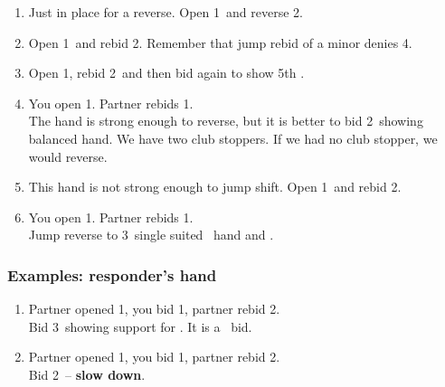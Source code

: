 \documentclass[12pt, a4paper]{article}
\begin{document}
\begin{enumerate}
    \item
        Just in place for a reverse. Open 1\clubs\ and reverse 2\hearts.
    \item
        Open 1\diams\ and rebid 2\hearts. Remember that jump rebid of a minor 
        denies 4\major.
    \item 
        Open 1\clubs, rebid 2\hearts\ and then bid again to show 5th \hearts.
    \item 
        You open 1\diams. Partner rebids 1\spades. \\
        The hand is strong enough to reverse, but
        it is better to bid 2\nt\ showing balanced hand. We have two club stoppers. If we had no
        club stopper, we would reverse.
    \item 
        This hand is not strong enough to jump shift. Open 1\diams\ and rebid 2\clubs.
    \item
        You open 1\clubs. Partner rebids 1\spades. \\
        Jump reverse to 3\diams\ single suited \clubs\ hand and \gf.
        
\end{enumerate}

\subsubsection*{Examples: responder's hand}
\begin{enumerate}
    \item
        Partner opened 1\diams, you bid 1\spades, partner rebid 2\hearts. \\
        Bid 3\diams\ showing support for \diams. It is a \gf\ bid.
    \item
        Partner opened 1\diams, you bid 1\spades, partner rebid 2\hearts. \\
        Bid 2\nt\ -- \textbf{slow down}.
\end{enumerate}
\end{document}
